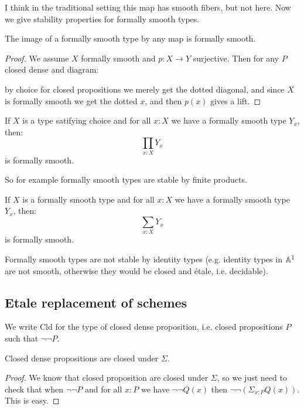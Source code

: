 I think in the traditional setting this map has smooth fibers, but not here. Now we give stability properties for formally smooth types.

\begin{proposition}
\label{smoothSurjective}
The image of a formally smooth type by any map is formally smooth.
\end{proposition}
\begin{proof}
We assume $X$ formally smooth and $p:X\to Y$ surjective. Then for any $P$ closed dense and diagram:
 \begin{center}
    \end{center} 
    by choice for closed propositions we merely get the dotted diagonal, and since $X$ is formally smooth we get the dotted $x$, and then $p(x)$ gives a lift.
\end{proof}

\begin{lemma}
If $X$ is a type satifying choice and for all $x:X$ we have a formally smooth type $Y_x$, then:
\[\prod_{x:X}Y_x\]
is formally smooth.
\end{lemma}

So for example formally smooth types are stable by finite products. 

\begin{lemma}
If $X$ is a formally smooth type and for all $x:X$ we have a formally smooth type $Y_x$, then:
\[\sum_{x:X}Y_x\]
is formally smooth.
\end{lemma}

Formally smooth types are not stable by identity types (e.g. identity types in $\mathbb{A}^1$ are not smooth, otherwise they would be closed and étale, i.e. decidable).

\subsection{Etale replacement of schemes}

We write $\mathrm{Cld}$ for the type of closed dense proposition, i.e. closed propositions $P$ such that $\neg\neg P$.

\begin{lemma}
Closed dense propositions are closed under $\Sigma$.
\end{lemma}
\begin{proof}
We know that closed proposition are closed under $\Sigma$, so we just need to check that when $\neg\neg P$ and for all $x:P$ we have $\neg\neg Q(x)$ then $\neg\neg(\Sigma_{x:P}Q(x))$. This is easy.
\end{proof}

